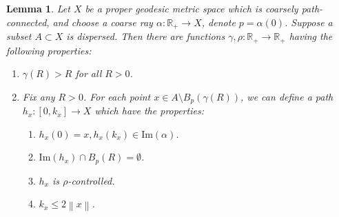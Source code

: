 \documentclass[10pt,a4paper]{amsart}
\newtheorem{lemma}{Lemma}
\newcommand {\Rplus}    {\mathbb{R}_{+}}
\newcommand {\im}       {\text{Im}}
\newcommand {\norm} [1] {\left\| #1 \right\|}
\begin{document}
\begin{lemma}
    \label{lem:technical}
    Let \( X \) be a proper geodesic metric space which is coarsely path-connected, 
    and choose a coarse ray \( \alpha : \Rplus \to X \), denote
    \( p = \alpha(0) \). Suppose a subset \( A \subset X \) is dispersed. Then 
    there are functions \( \gamma, \rho : \Rplus \to \Rplus \) having the
    following properties:
    \begin{enumerate}
        \item \( \gamma(R) > R \) for all \( R > 0 \).
        \item Fix any \( R > 0 \). For each point \( x \in A \setminus B _{p} (\gamma(R)) \),
              we can define a path \( h_x : [0, k_x] \to X \) which have the properties:
              \begin{enumerate}
                  \item \( h_x (0) = x, h_x(k_x) \in \im (\alpha) \).
                  \item \( \im (h_x) \cap B _{p} (R) = \emptyset \).
                  \item \( h_x \) is \( \rho \)-controlled.
                  \item \( k_x \leq 2 \norm x \).
              \end{enumerate}
    \end{enumerate}
\end{lemma}
\end{document}
